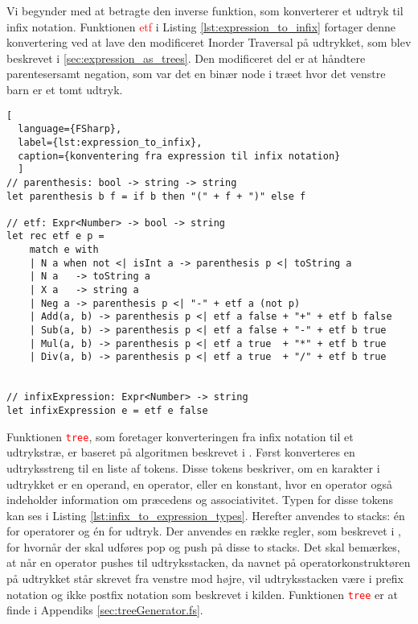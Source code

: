 Vi begynder med at betragte den inverse funktion, som konverterer et udtryk til infix notation. Funktionen \textcolor{red}{etf} i Listing \ref{lst:expression_to_infix} fortager denne konvertering ved at lave den modificeret Inorder Traversal på udtrykket, som blev beskrevet i \ref{sec:expression_as_trees}. Den modificeret del er at håndtere parentesersamt negation, som var det en binær node i træet hvor det venstre barn er et tomt udtryk.

\begin{lstlisting}[
  language={FSharp}, 
  label={lst:expression_to_infix}, 
  caption={konventering fra expression til infix notation}
  ]
// parenthesis: bool -> string -> string
let parenthesis b f = if b then "(" + f + ")" else f

// etf: Expr<Number> -> bool -> string
let rec etf e p =
    match e with
    | N a when not <| isInt a -> parenthesis p <| toString a
    | N a   -> toString a
    | X a   -> string a
    | Neg a -> parenthesis p <| "-" + etf a (not p) 
    | Add(a, b) -> parenthesis p <| etf a false + "+" + etf b false
    | Sub(a, b) -> parenthesis p <| etf a false + "-" + etf b true
    | Mul(a, b) -> parenthesis p <| etf a true  + "*" + etf b true
    | Div(a, b) -> parenthesis p <| etf a true  + "/" + etf b true


// infixExpression: Expr<Number> -> string
let infixExpression e = etf e false
\end{lstlisting}

Funktionen \textcolor{red}{\texttt{tree}}, som foretager konverteringen fra infix notation til et udtrykstræ, er baseret på algoritmen beskrevet i \cite{convert_expression}. Først konverteres en udtryksstreng til en liste af tokens. Disse tokens beskriver, om en karakter i udtrykket er en operand, en operator, eller en konstant, hvor en operator også indeholder information om præcedens og associativitet. Typen for disse tokens kan ses i Listing \ref{lst:infix_to_expression_types}. Herefter anvendes to stacks: én for operatorer og én for udtryk. Der anvendes en række regler, som beskrevet i \cite{convert_expression}, for hvornår der skal udføres pop og push på disse to stacks. Det skal bemærkes, at når en operator pushes til udtryksstacken, da navnet på operatorkonstruktøren på udtrykket står skrevet fra venstre mod højre, vil udtryksstacken være i prefix notation og ikke postfix notation som beskrevet i kilden. Funktionen \textcolor{red}{\texttt{tree}} er at finde i Appendiks \ref{sec:treeGenerator.fs}.

